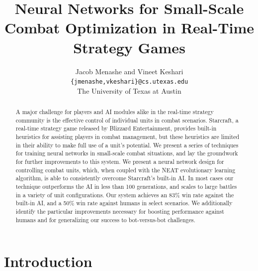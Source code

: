 \documentclass[10pt,a4paper,twocolumn]{article}
\begin{document}
\title{Neural Networks for Small-Scale Combat Optimization in Real-Time Strategy Games}
\author{Jacob Menashe and Vineet Keshari \\ \texttt{\{jmenashe,vkeshari\}@cs.utexas.edu} \\ The University of Texas at Austin}
\maketitle

\begin{abstract}
A major challenge for players and AI modules alike in the real-time strategy community is the effective control of individual units in combat scenarios. Starcraft, a real-time strategy game released by Blizzard Entertainment, provides built-in heuristics for assisting players in combat management, but these heuristics are limited in their ability to make full use of a unit's potential. We present a series of techniques for training neural networks in small-scale combat situations, and lay the groundwork for further improvements to this system. We present a neural network design for controlling combat units, which, when coupled with the NEAT evolutionary learning algorithm, is able to consistently overcome Starcraft's built-in AI. In most cases our technique outperforms the AI in less than 100 generations, and scales to large battles in a variety of unit configurations. Our system achieves an 83\% win rate against the built-in AI, and a 50\% win rate against humans in select scenarios. We additionally identify the particular improvements necessary for boosting performance against humans and for generalizing our success to bot-versus-bot challenges.
\end{abstract}

\section{Introduction}
\end{document}
